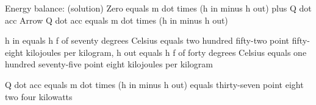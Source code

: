 Energy balance: (solution)  
Zero equals m dot times (h in minus h out) plus Q dot acc  
Arrow Q dot acc equals m dot times (h in minus h out)  

h in equals h f of seventy degrees Celsius equals two hundred fifty-two point fifty-eight kilojoules per kilogram, h out equals h f of forty degrees Celsius equals one hundred seventy-five point eight kilojoules per kilogram  

Q dot acc equals m dot times (h in minus h out) equals thirty-seven point eight two four kilowatts